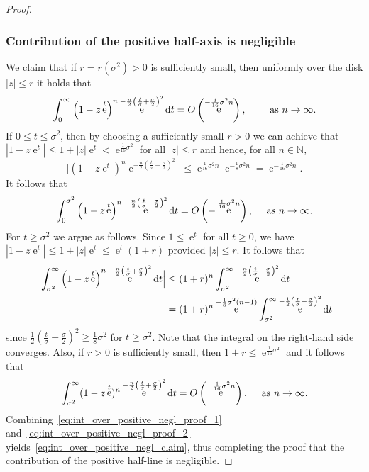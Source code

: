 \documentclass[10pt]{amsart}
\theoremstyle{definition}\newtheorem{defi}[theo]{Definition}\newtheorem{rema}[theo]{Remark}\newtheorem{exam}[theo]{Example}\newtheorem{exem}[theo]{Example}\newtheorem{nota}[theo]{Notation}
\DeclareMathOperator{\eee}{e}
\newcommand{\N}{\mathbb{N}}
\newcommand*\dint{\text{\normalfont d}}
\begin{document}
\begin{proof}
\subsubsection*{Contribution of the positive half-axis is negligible}
We claim that if $r = r(\sigma^2)>0$ is sufficiently small, then uniformly over the disk $|z|\leq r$ it holds that
\begin{equation}\label{eq:int_over_positive_negl_claim}
\int_0^\infty \left(1 - z\eee^t\right)^n \eee^{-\frac n2 \left(\frac{t}{\sigma} + \frac \sigma 2\right)^2} \dint t = O\left(\eee^{ - \frac{1} {16} \sigma^2 n}\right),
\qquad
\text{ as } n \to\infty.
\end{equation}
If $0\leq t \leq \sigma^2$, then by choosing a sufficiently small $r>0$ we can achieve that $|1 - z\eee^t|\leq 1 + |z|\eee^t < \eee^{\frac 1 {16}\sigma^2}$ for all $|z|\leq r$ and hence, for all $n\in \N$,
\[
\Big |\left(1 - z\eee^t\right)^n \eee^{-\frac n2 \left(\frac{t}{\sigma} + \frac \sigma 2\right)^2}\Big |
\leq
\eee^{\frac{1}{16} \sigma^2 n} \eee^{- \frac {1}{8}\sigma^2 n} =
\eee^{-\frac{1}{16} \sigma^2 n}.
\]
It follows that
\begin{equation}\label{eq:int_over_positive_negl_proof_1}
\int_0^{\sigma^2} \left(1 - z\eee^t\right)^n \eee^{-\frac n2 \left(\frac{t}{\sigma} + \frac \sigma 2\right)^2} \dint t =O\left(-\eee^{\frac 1 {16}\sigma^2 n}\right),
\quad
\text{ as } n\to\infty.
\end{equation}
For $t\geq \sigma^2$ we argue as follows. Since $1\leq \eee^t$ for all $t\geq 0$, we have $|1 - z \eee^t|\leq 1 + |z|\eee^t \leq \eee^t (1+r)$ provided $|z|\leq r$. It follows that
\begin{align*}
\Big | \int_{\sigma^2}^\infty \left(1 - z\eee^t\right)^n \eee^{-\frac n2 \left(\frac{t}{\sigma} + \frac \sigma 2\right)^2} \dint t \Big|
&\leq (1+r)^n \int_{\sigma^2}^\infty \eee^{-\frac n2 \left(\frac{t}{\sigma} - \frac \sigma 2\right)^2} \dint t \\
&= (1+r)^n \eee^{-\frac 1 8 \sigma^2 (n-1)} \int_{\sigma^2}^\infty \eee^{-\frac 12 \left(\frac{t}{\sigma} - \frac \sigma 2\right)^2} \dint t
\end{align*}
since $\frac 1 2 (\frac{t}{\sigma} - \frac \sigma 2)^2 \geq \frac 18 \sigma^2$ for $t\geq \sigma^2$. Note that the integral on the right-hand side converges. Also, if $r>0$ is sufficiently small, then $1+ r \leq \eee^{\frac 1 {16} \sigma^2}$ and it follows that
\begin{equation}\label{eq:int_over_positive_negl_proof_2}
\int_{\sigma^2}^\infty (1 - z\eee^t)^n \eee^{-\frac n2 \left(\frac{t}{\sigma} + \frac \sigma 2\right)^2} \dint t = O\left(\eee^{ -\frac 1 {16} \sigma^2 n}\right),
\quad
\text{ as } n\to\infty.
\end{equation}
Combining~\eqref{eq:int_over_positive_negl_proof_1} and~\eqref{eq:int_over_positive_negl_proof_2} yields~\eqref{eq:int_over_positive_negl_claim}, thus completing the proof that the contribution of the positive half-line is negligible.


\end{proof}
\end{document}
